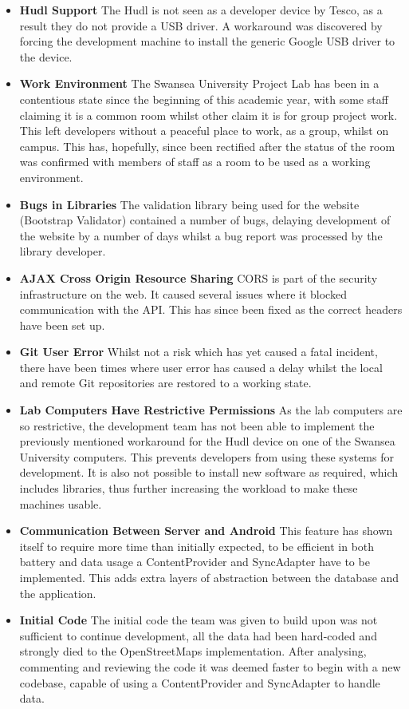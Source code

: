 \documentclass[11pt,a4paper]{article}
\begin{document}
\begin{itemize}
\item\textbf{Hudl Support} The Hudl is not seen as a developer device by Tesco, as a result they do not provide a USB driver. A workaround was discovered by forcing the development machine to install the generic Google USB driver to the device.
\item\textbf{Work Environment} The Swansea University Project Lab has been in a contentious state since the beginning of this academic year, with some staff claiming it is a common room whilst other claim it is for group project work. This left developers without a peaceful place to work, as a group, whilst on campus. This has, hopefully, since been rectified after the status of the room was confirmed with members of staff as a room to be used as a working environment.
\item\textbf{Bugs in Libraries} The validation library being used for the website (Bootstrap Validator\cite{bootstrapValidator}) contained a number of bugs, delaying development of the website by a number of days whilst a bug report was processed by the library developer.
\item\textbf{AJAX Cross Origin Resource Sharing} CORS is part of the security infrastructure on the web. It caused several issues where it blocked communication with the API. This has since been fixed as the correct headers have been set up. 
\item\textbf{Git User Error} Whilst not a risk which has yet caused a fatal incident, there have been times where user error has caused a delay whilst the local and remote Git repositories are restored to a working state.
\item\textbf{Lab Computers Have Restrictive Permissions} As the lab computers are so restrictive, the development team has not been able to implement the previously mentioned workaround for the Hudl device on one of the Swansea University computers. This prevents developers from using these systems for development. It is also not possible to install new software as required, which includes libraries, thus further increasing the workload to make these machines usable.
\item\textbf{Communication Between Server and Android} This feature has shown itself to require more time than initially expected, to be efficient in both battery and data usage a ContentProvider and SyncAdapter have to be implemented. This adds extra layers of abstraction between the database and the application.
\item\textbf{Initial Code} The initial code the team was given to build upon was not sufficient to continue development, all the data had been hard-coded and strongly died to the OpenStreetMaps implementation. After analysing, commenting and reviewing the code it was deemed faster to begin with a new codebase, capable of using a ContentProvider and SyncAdapter to handle data.
\end{itemize}
\end{document}
